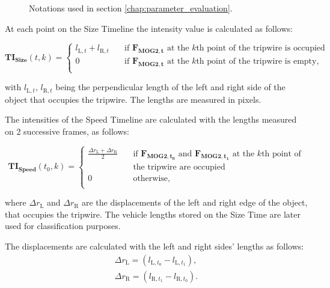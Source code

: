 \begin{figure}[!h]
	\centering
	
	\caption{Notations used in section \ref{chap:parameter_evaluation}. \label{fig:parameter_notations}}
\end{figure}

At each point on the Size Timeline the intensity value is calculated as follows:

\begin{displaymath}
 	\boldsymbol{TI_{\text{Size}}}(t,k) = 
	\begin{cases}
	l_{\text{L},t} + l_{\text{R},t}        & \quad \text{if } \boldsymbol{F_{\text{MOG2},t}} \text{ at the } k\text{th} \text{ point of the tripwire is occupied}\\
  	0		& \quad \text{if } \boldsymbol{F_{\text{MOG2},t}} \text{ at the } k\text{th} \text{ point of the tripwire is empty,}\\
	\end{cases}
\end{displaymath}

with $l_{\text{L},t}$, $l_{\text{R},t}$ being the perpendicular length of the left and right side of the object that occupies the tripwire.
The lengths are measured in pixels.

The intensities of the Speed Timeline are calculated with the lengths measured on 2 successive frames, as follows:

\begin{displaymath}
\boldsymbol{TI_{\text{Speed}}}(t_0,k) = 
\begin{cases}
\frac{\Delta r_{\text{L}} + \Delta r_{\text{R}}}{2}      & \quad \text{if } \boldsymbol{F_{\text{MOG2},t_0}} \text{ and } \boldsymbol{F_{\text{MOG2},t_1}} \text{ at the } k\text{th} \text{ point of} \\ & \quad \text{the tripwire are occupied}\\
0		& \quad \text{otherwise,}\\
\end{cases}
\end{displaymath}
 
where $\Delta r_{\text{L}}$ and $\Delta r_{\text{R}}$ are the displacements of the left and right edge of the object, that occupies the tripwire.
The vehicle lengths stored on the Size Time are later used for classification purposes.

The displacements are calculated with the left and right sides' lengths as follows:
\begin{gather*}
\Delta r_{\text{L}} = \left( l_{\text{L},t_0} - l_{\text{L},t_1} \right),  \\
\Delta r_{\text{R}} = \left( l_{\text{R},t_1} - l_{\text{R},t_0}\right).
\end{gather*}

